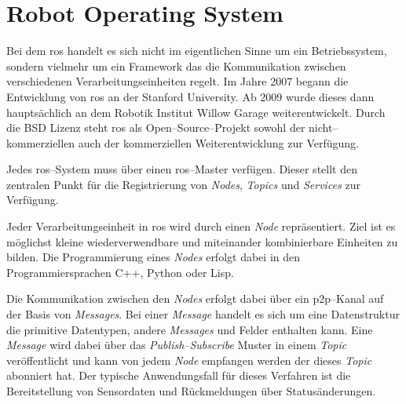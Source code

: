 \begin{comment}
------------------------------------------------------------------------------------------
- Launch Files
	- Tool to manage a robotic system
	- starting of multiple nodes
	- setting of parameter values
	- setting of arguments
	- including other launch files
- Parameter Server
	- Global key-value store for sharing configuration informationen
- Transformation
	- static
	- dynamic
	- TFs are implemented with a forward description from parent to child (from → to )
	- Each child frame has a maximum of one parent frame, but a parent frame can be linked to many child frames (tree structured)
	- Listener / Broadcaster
\end{comment}
\section{Robot Operating System}

Bei dem \Gls{ros} handelt es sich nicht im eigentlichen Sinne um ein Betriebssystem, sondern vielmehr um ein Framework das die Kommunikation zwischen verschiedenen Verarbeitungseinheiten regelt. Im Jahre 2007 begann die Entwicklung von \Gls{ros} an der Stanford University. Ab 2009 wurde dieses dann hauptsächlich an dem Robotik Institut Willow Garage weiterentwickelt. Durch die BSD Lizenz steht \Gls{ros} als Open--Source--Projekt sowohl der nicht--kommerziellen auch der kommerziellen Weiterentwicklung zur Verfügung. \cite{quigley2009ros}

Jedes \Gls{ros}--System muss über einen \Gls{ros}--Master verfügen. Dieser stellt den zentralen Punkt für die Registrierung von \textit{Nodes}, \textit{Topics} und \textit{Services} zur Verfügung.

Jeder Verarbeitungseinheit in \Gls{ros} wird durch einen \textit{Node} repräsentiert. Ziel ist es möglichst kleine wiederverwendbare und miteinander kombinierbare Einheiten zu bilden. Die Programmierung eines \textit{Nodes} erfolgt dabei in den Programmiersprachen C++, Python oder Lisp.

Die Kommunikation zwischen den \textit{Nodes} erfolgt dabei über ein \Gls{p2p}--Kanal auf der Basis von \textit{Messages}. Bei einer \textit{Message} handelt es sich um eine Datenstruktur die primitive Datentypen, andere \textit{Messages} und Felder enthalten kann. Eine \textit{Message} wird dabei über das \textit{Publish--Subscribe} Muster in einem \textit{Topic} veröffentlicht und kann von jedem \textit{Node} empfangen werden der dieses \textit{Topic} abonniert hat. Der typische Anwendungsfall für dieses Verfahren ist die Bereitstellung von Sensordaten und Rückmeldungen über Statusänderungen.

